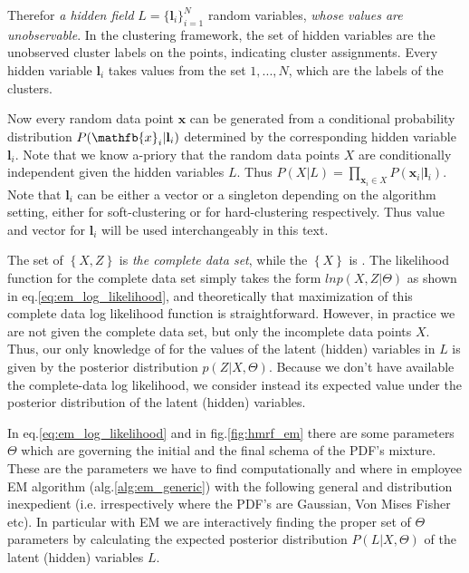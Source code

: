 \documentclass[dvips,dvipdfm,pdftex]{llncs}
\begin{document}
Therefor \emph{a hidden field} $L=\{\mathbf{l}_{i}\}_{i=1}^{N}$ random variables, \emph{whose values are unobservable}. In the clustering framework, the set of hidden variables are the unobserved cluster labels on the
points, indicating cluster assignments. Every hidden variable $\mathbf{l}_{i}$ takes values from the set ${1, . . . , N}$, which are the labels of the clusters.

Now every random data point $\mathbf{x}$ can be generated from a conditional probability distribution $P(\mathfb{x}_{i}|\mathbf{l}_{i})$ determined by the corresponding hidden variable $\mathbf{l}_{i}$. Note that we know a-priory that the random data points $X$ are conditionally independent given the hidden variables $L$. Thus $P(X|L) = \prod_{\mathbf{x}_{i} \in X}P(\mathbf{x}_{i}|\mathbf{l}_{i})$. Note that $\mathbf{l}_{i}$ can be either a vector or a singleton depending on the algorithm setting, either for soft-clustering or for hard-clustering respectively. Thus value and vector for $\mathbf{l}_{i}$ will be used interchangeably in this text.

The set of $\left\{X,Z\right\}$ is \emph{the complete data set}, while the $\left\{X\right\}$ is . The likelihood function for the complete data set simply takes the form $lnp(X,Z|\Theta)$ as shown in eq.\ref{eq:em_log_likelihood}, and theoretically that maximization of this complete data log likelihood function is straightforward. However, in practice we are not given the complete data set, but only the incomplete data points $X$. Thus, our only knowledge of for the values of the latent (hidden) variables in $L$ is given by the posterior distribution $p(Z|X,\Theta)$. Because we don't have available the complete-data log likelihood, we consider instead its expected value under the posterior distribution of the latent (hidden) variables.

In eq.\ref{eq:em_log_likelihood} and in fig.\ref{fig:hmrf_em} there are some parameters $\Theta$ which are governing the initial and the final schema of the PDF's mixture. These are the parameters we have to find computationally and where in employee EM algorithm (alg.\ref{alg:em_generic}) with the following general and distribution inexpedient (i.e. irrespectively where the PDF's are Gaussian, Von Mises Fisher etc). In particular with EM we are interactively finding the proper set of $\Theta$ parameters by calculating the expected posterior distribution $P(L|X,\Theta)$ of the latent (hidden) variables $L$.
\end{document}
